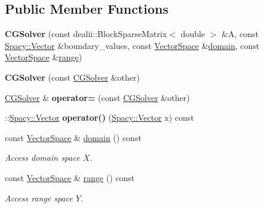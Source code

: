\subsection*{\-Public \-Member \-Functions}
\begin{DoxyCompactItemize}
\item 
\hypertarget{classSpacy_1_1dealII_1_1CGSolver_a7fb88dbd71bd1d9a875aa32fbc20ca1a}{{\bfseries \-C\-G\-Solver} (const dealii\-::\-Block\-Sparse\-Matrix$<$ double $>$ \&\-A, const \hyperlink{classSpacy_1_1Vector}{\-Spacy\-::\-Vector} \&boundary\-\_\-values, const \hyperlink{classSpacy_1_1VectorSpace}{\-Vector\-Space} \&\hyperlink{classSpacy_1_1OperatorBase_a2588f9b3e0188820c4c494e63293dc6f}{domain}, const \hyperlink{classSpacy_1_1VectorSpace}{\-Vector\-Space} \&\hyperlink{classSpacy_1_1OperatorBase_ab19d3b7a6f290b1079248f1e567e53d6}{range})}\label{classSpacy_1_1dealII_1_1CGSolver_a7fb88dbd71bd1d9a875aa32fbc20ca1a}

\item 
\hypertarget{classSpacy_1_1dealII_1_1CGSolver_ad9b75390b2b2deeda4e2372c48739ba1}{{\bfseries \-C\-G\-Solver} (const \hyperlink{classSpacy_1_1dealII_1_1CGSolver}{\-C\-G\-Solver} \&other)}\label{classSpacy_1_1dealII_1_1CGSolver_ad9b75390b2b2deeda4e2372c48739ba1}

\item 
\hypertarget{classSpacy_1_1dealII_1_1CGSolver_ad66678932354cb523292c90bb9148464}{\hyperlink{classSpacy_1_1dealII_1_1CGSolver}{\-C\-G\-Solver} \& {\bfseries operator=} (const \hyperlink{classSpacy_1_1dealII_1_1CGSolver}{\-C\-G\-Solver} \&other)}\label{classSpacy_1_1dealII_1_1CGSolver_ad66678932354cb523292c90bb9148464}

\item 
\hypertarget{classSpacy_1_1dealII_1_1CGSolver_ae36d85194fbd49f5658eccfada2c3214}{\-::\hyperlink{classSpacy_1_1Vector}{\-Spacy\-::\-Vector} {\bfseries operator()} (\hyperlink{classSpacy_1_1Vector}{\-Spacy\-::\-Vector} x) const }\label{classSpacy_1_1dealII_1_1CGSolver_ae36d85194fbd49f5658eccfada2c3214}

\item 
\hypertarget{classSpacy_1_1OperatorBase_a2588f9b3e0188820c4c494e63293dc6f}{const \hyperlink{classSpacy_1_1VectorSpace}{\-Vector\-Space} \& \hyperlink{classSpacy_1_1OperatorBase_a2588f9b3e0188820c4c494e63293dc6f}{domain} () const }\label{classSpacy_1_1OperatorBase_a2588f9b3e0188820c4c494e63293dc6f}

\begin{DoxyCompactList}\small\item\em \-Access domain space $X$. \end{DoxyCompactList}\item 
\hypertarget{classSpacy_1_1OperatorBase_ab19d3b7a6f290b1079248f1e567e53d6}{const \hyperlink{classSpacy_1_1VectorSpace}{\-Vector\-Space} \& \hyperlink{classSpacy_1_1OperatorBase_ab19d3b7a6f290b1079248f1e567e53d6}{range} () const }\label{classSpacy_1_1OperatorBase_ab19d3b7a6f290b1079248f1e567e53d6}

\begin{DoxyCompactList}\small\item\em \-Access range space $Y$. \end{DoxyCompactList}\end{DoxyCompactItemize}
